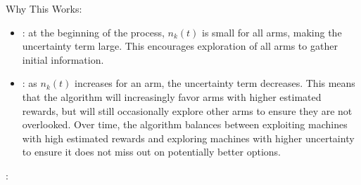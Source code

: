 \documentclass[letterpaper,10pt,english]{jupyterBook}
\begin{document}
\sphinxAtStartPar
Why This Works:
\begin{itemize}
\item {} 
\sphinxAtStartPar
{}: at the beginning of the process, \(n_k(t)\) is small for all arms, making the uncertainty term large. This encourages exploration of all arms to gather initial information.

\item {} 
\sphinxAtStartPar
{}: as \(n_k(t)\) increases for an arm, the uncertainty term decreases. This means that the algorithm will increasingly favor arms with higher estimated rewards, but will still occasionally explore other arms to ensure they are not overlooked. Over time, the algorithm balances between exploiting machines with high estimated rewards and exploring machines with higher uncertainty to ensure it does not miss out on potentially better options.

\end{itemize}

\sphinxAtStartPar
{}:
\end{document}
